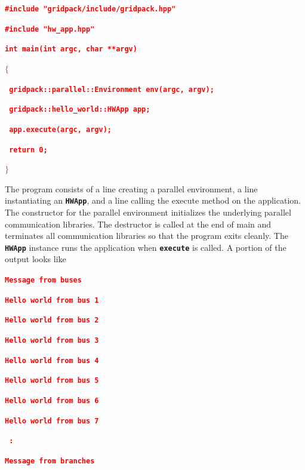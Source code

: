 \documentclass[12pt]{report} %
\begin{document}
\textcolor{red}{\texttt{\textbf{\#include "gridpack/include/gridpack.hpp"}}}

\textcolor{red}{\texttt{\textbf{\#include "hw\_app.hpp"}}}

\textcolor{red}{\texttt{\textbf{}}}

\textcolor{red}{\texttt{\textbf{int main(int argc, char **argv)}}}

\textcolor{red}{\texttt{\textbf{$\boldsymbol{\mathrm{\{}}$}}}

\textcolor{red}{\texttt{\textbf{  gridpack::parallel::Environment env(argc, argv);}}}

\textcolor{red}{\texttt{\textbf{}}}

\textcolor{red}{\texttt{\textbf{  gridpack::hello\_world::HWApp app;}}}

\textcolor{red}{\texttt{\textbf{  app.execute(argc, argv);}}}

\textcolor{red}{\texttt{\textbf{  return 0;}}}

\textcolor{red}{\texttt{\textbf{$\boldsymbol{\mathrm{\}}}$}}}

The program consists of a line creating a parallel environment, a line instantiating an \texttt{\textbf{HWApp}}, and a line calling the execute method on the application. The constructor for the parallel environment initializes the underlying parallel communication libraries. The destructor is called at the end of main and terminates all communication libraries so that the program exits cleanly. The \texttt{\textbf{HWApp}} instance runs the application when \texttt{\textbf{execute}} is called. A portion of the output looks like

\textcolor{red}{\texttt{\textbf{Message from buses}}}

\textcolor{red}{\texttt{\textbf{Hello world from bus 1}}}

\textcolor{red}{\texttt{\textbf{Hello world from bus 2}}}

\textcolor{red}{\texttt{\textbf{Hello world from bus 3}}}

\textcolor{red}{\texttt{\textbf{Hello world from bus 4}}}

\textcolor{red}{\texttt{\textbf{Hello world from bus 5}}}

\textcolor{red}{\texttt{\textbf{Hello world from bus 6}}}

\textcolor{red}{\texttt{\textbf{Hello world from bus 7}}}

\textcolor{red}{\texttt{\textbf{     :}}}

\textcolor{red}{\texttt{\textbf{Message from branches}}}
\end{document}
